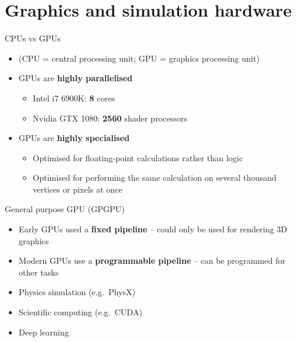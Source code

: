 \newcommand\blfootnote[1]{%
  \begingroup
  \renewcommand\thefootnote{}\footnote{#1}%
  \addtocounter{footnote}{-1}%
  \endgroup
}

\part{Graphics and simulation hardware}
\frame{\partpage}

\begin{frame}{CPUs vs GPUs}
	\begin{itemize}
		\pause \item (CPU = central processing unit; GPU = graphics processing unit)
		\pause \item GPUs are \textbf{highly parallelised}
			\begin{itemize}
				\pause \item Intel i7 6900K: \textbf{8} cores
				\pause \item Nvidia GTX 1080: \textbf{2560} shader processors
			\end{itemize}
		\pause \item GPUs are \textbf{highly specialised}
			\begin{itemize}
				\pause \item Optimised for floating-point calculations rather than logic
				\pause \item Optimised for performing the same calculation on several thousand vertices or pixels at once
			\end{itemize}
	\end{itemize}
\end{frame}

\begin{frame}{General purpose GPU (GPGPU)}
	\begin{itemize}
		\pause \item Early GPUs used a \textbf{fixed pipeline} -- could only be used for rendering 3D graphics
		\pause \item Modern GPUs use a \textbf{programmable pipeline} -- can be programmed for other tasks
		\pause \item Physics simulation (e.g.\ PhysX)
		\pause \item Scientific computing (e.g.\ CUDA)
		\pause \item Deep learning
	\end{itemize}
\end{frame}

